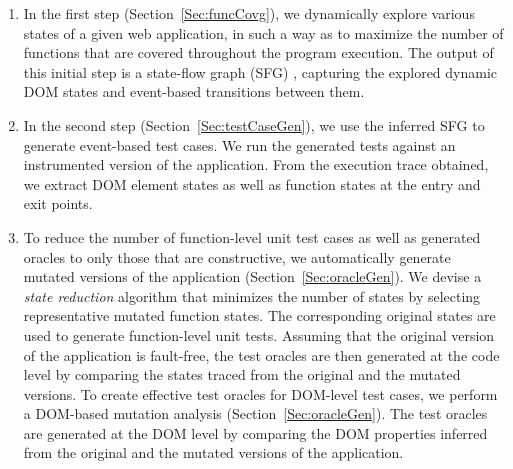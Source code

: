 \begin{enumerate}
 
\item In the first step (Section~\ref{Sec:funcCovg}), we dynamically explore various states of a given web 
application, in such a way as to maximize the number of functions that are covered throughout the program execution. The output of this initial step is a state-flow graph (SFG) \cite{mesbah:tse12}, capturing the explored dynamic DOM states and event-based transitions between them. 

\item In the second step (Section~\ref{Sec:testCaseGen}), we use the inferred SFG to generate event-based test cases.
We run the generated tests against an instrumented version of the application. From the execution trace obtained, we extract DOM element states as well as \javascript function states at the entry and exit points.%

\item To reduce the number of function-level unit test cases as well as generated oracles to only those that are constructive, 
we automatically generate mutated versions of the application (Section~\ref{Sec:oracleGen}). We devise a \emph{state reduction} algorithm that minimizes the number of states by selecting representative mutated function states. The corresponding original states are used to generate function-level unit tests.
Assuming that the original version of the application is fault-free, the test oracles are then generated at the code level by comparing the states traced from the original and the mutated versions.
To create effective test oracles for DOM-level test cases, we perform a DOM-based mutation analysis (Section~\ref{Sec:oracleGen}).
The test oracles are generated at the DOM level by comparing the DOM properties inferred from the original and the mutated versions of the application.

\end{enumerate}




  

   